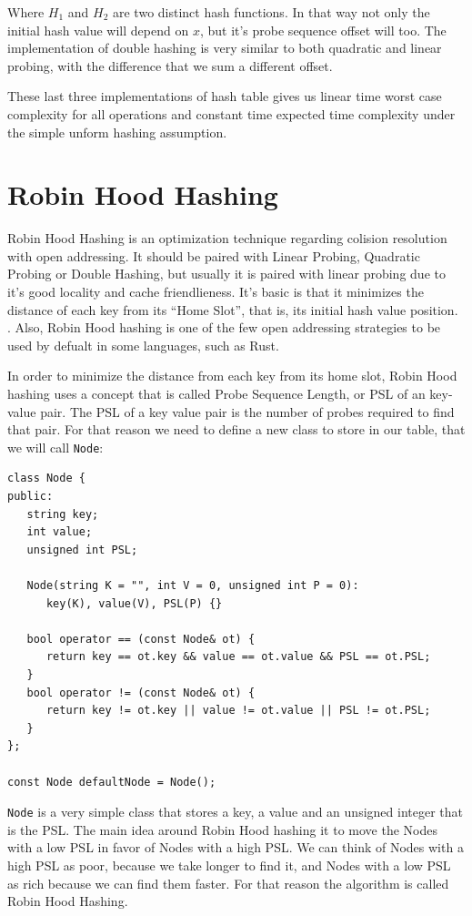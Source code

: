 Where \( H_1 \) and \( H_2 \) are two distinct hash functions. In that way not only the initial hash value will depend on \( x \), but it's probe sequence offset will too. The implementation of double hashing is very similar to both quadratic and linear probing, with the difference that we sum a different offset.

These last three implementations of hash table gives us linear time worst case complexity for all operations and constant time expected time complexity under the simple unform hashing assumption.

\section{Robin Hood Hashing}

Robin Hood Hashing is an optimization technique regarding colision resolution with open addressing. It should be paired with Linear Probing, Quadratic Probing or Double Hashing, but usually it is paired with linear probing due to it's good locality and cache friendlieness. It's basic is that it minimizes the distance of each key from its ``Home Slot'', that is, its initial hash value position. \citep{RobinHoodHashing}. Also, Robin Hood hashing is one of the few open addressing strategies to be used by defualt in some languages, such as Rust.

In order to minimize the distance from each key from its home slot, Robin Hood hashing uses a concept that is called Probe Sequence Length, or PSL of an key-value pair. The PSL of a key value pair is the number of probes required to find that pair. For that reason we need to define a new class to store in our table, that we will call \texttt{Node}:

\begin{lstlisting}
class Node {
public:
   string key;
   int value;
   unsigned int PSL;
   
   Node(string K = "", int V = 0, unsigned int P = 0):
      key(K), value(V), PSL(P) {}

   bool operator == (const Node& ot) {
      return key == ot.key && value == ot.value && PSL == ot.PSL;
   }
   bool operator != (const Node& ot) {
      return key != ot.key || value != ot.value || PSL != ot.PSL;
   }
};

const Node defaultNode = Node();
\end{lstlisting}

\texttt{Node} is a very simple class that stores a key, a value and an unsigned integer that is the PSL. The main idea around Robin Hood hashing it to move the Nodes with a low PSL in favor of Nodes with a high PSL. We can think of Nodes with a high PSL as poor, because we take longer to find it, and Nodes with a low PSL as rich because we can find them faster. For that reason the algorithm is called Robin Hood Hashing.

